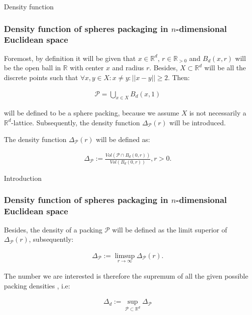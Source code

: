 \documentclass[10pt]{beamer}
\begin{document}
\begin{frame}{Density function}
    \frametitle{Density function of spheres packaging in $n$-dimensional Euclidean space}
    
    Foremost, by definition it will be given that $x \in \mathbb{R}^d$, $r \in \mathbb{R}_{>0}$ and $B_d(x, r)$ will be the open ball in $\mathbb{R}$ with center $x$ and radius $r$. Besides, $X \subset \mathbb{R}^d$ will be all the discrete points such that $\forall x, y \in X: x \neq y: ||x-y|| \geq 2$. Then: 
    
    \begin{equation} \label{1}
    \begin{split}
        \mathcal{P} = \bigcup_{x \in X} B_d(x, 1) 
    \end{split}
    \end{equation}

will be defined to be a sphere packing, because we assume $X$ is not necessarily a $\mathbb{R}^d$-lattice. Subsequently, the density function $\Delta_\mathcal{P}(r)$ will be introduced. 

    \begin{definition} 
    
    The density function $\Delta_\mathcal{P}(r)$ will be defined as: 
    
    
    \begin{equation} \label{2}
    \begin{split}
        \Delta_\mathcal{P} := \frac{Vol(\mathcal{P} \cap B_d(0, r))}{Vol(B_d(0, r))}, r > 0.
    \end{split}
    \end{equation}
\end{definition}
\end{frame}

\begin{frame}{Introduction}
    \frametitle{Density function of spheres packaging in $n$-dimensional Euclidean space}
    
    Besides, the density  of a packing $\mathcal{P}$ will be defined as the limit superior of $\Delta_\mathcal{P}(r)$, subsequently: 
    
    \begin{equation} \label{3}
    \begin{split}
        \Delta _\mathcal{P} := \limsup_{r \rightarrow \infty} \Delta _\mathcal{P}(r).
    \end{split}
    \end{equation}
    
    The number we are interested is therefore the supremum of all the given possible packing densities \cite{viazovska2017sphere}, i.e: 
    
    \begin{equation} \label{4}
    \begin{split}
        \Delta_d := \sup_{\mathcal{P} \subset \mathbb{R}^d} \Delta_\mathcal{P}
    \end{split}
    \end{equation}

\end{frame}
\end{document}
